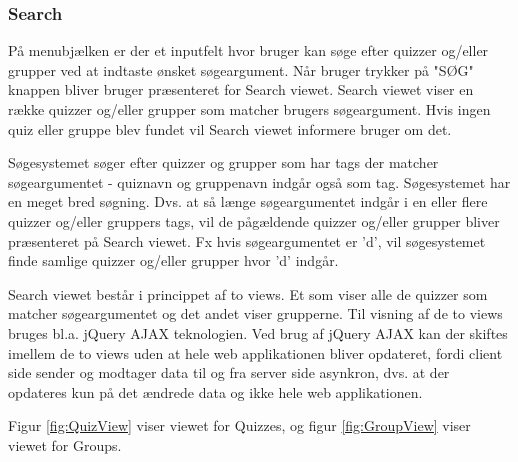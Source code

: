 \subsubsection{Search}

På menubjælken er der et inputfelt hvor bruger kan søge efter quizzer og/eller grupper ved at indtaste ønsket søgeargument. Når bruger trykker på "SØG" knappen bliver bruger præsenteret for Search viewet. Search viewet viser en række quizzer og/eller grupper som matcher brugers søgeargument. Hvis ingen quiz eller gruppe blev fundet vil Search viewet informere bruger om det. 

Søgesystemet søger  efter quizzer og grupper som har tags der matcher søgeargumentet - quiznavn og gruppenavn indgår også som tag. Søgesystemet har en meget bred søgning. Dvs. at så længe søgeargumentet indgår i en eller flere quizzer og/eller gruppers tags, vil de pågældende quizzer og/eller grupper bliver præsenteret på Search viewet. Fx hvis søgeargumentet er 'd', vil søgesystemet finde samlige quizzer og/eller grupper hvor 'd' indgår.  


Search viewet består i princippet af to views. Et som viser alle de quizzer som matcher søgeargumentet og det andet viser grupperne. Til visning af de to views bruges bl.a. jQuery AJAX teknologien. Ved brug af jQuery AJAX kan der skiftes imellem de to views uden at hele web applikationen bliver opdateret, fordi client side sender og modtager data til og fra server side asynkron, dvs. at der opdateres kun på det ændrede data og ikke hele web applikationen. 

Figur \ref{fig:QuizView} viser viewet for Quizzes, og figur \ref{fig:GroupView} viser viewet for Groups. 


